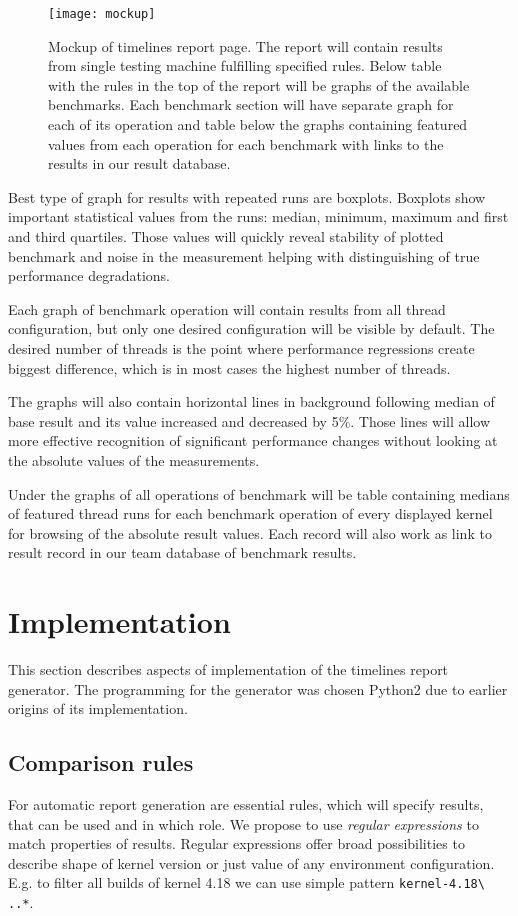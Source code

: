 \begin{figure}
  \centering
  \texttt{[image: mockup]}
  \caption{Mockup of timelines report page. The report will contain results from
    single testing machine fulfilling specified rules. Below table with the rules
    in the top of the report will be graphs of the available benchmarks. Each
    benchmark section will have separate graph for each of its operation and table
    below the graphs containing featured values from each operation for each
    benchmark with links to the results in our result database.}
  \label{fig:mockup}
\end{figure}

Best type of graph for results with repeated runs are boxplots. Boxplots show
important statistical values from the runs: median, minimum, maximum and first
and third quartiles. Those values will quickly reveal stability of plotted
benchmark and noise in the measurement helping with distinguishing of true
performance degradations.

Each graph of benchmark operation will contain results from all thread
configuration, but only one desired configuration will be visible by default.
The desired number of threads is the point where performance regressions create
biggest difference, which is in most cases the highest number of threads.

The graphs will also contain horizontal lines in background following median of
base result and its value increased and decreased by 5\%. Those lines will allow
more effective recognition of significant performance changes without looking at
the absolute values of the measurements.

Under the graphs of all operations of benchmark will be table containing medians
of featured thread runs for each benchmark operation of every displayed kernel
for browsing of the absolute result values. Each record will also work as link
to result record in our team database of benchmark results.

\section{Implementation}
This section describes aspects of implementation of the timelines report generator.
The programming for the generator was chosen Python2 due to earlier origins of
its implementation.

\subsection{Comparison rules}
For automatic report generation are essential rules, which will specify results,
that can be used and in which role. We propose to use \emph{regular expressions} to match
properties of results. Regular expressions offer broad possibilities to describe
shape of kernel version or just value of any environment configuration. E.g. to filter
all builds of kernel 4.18 we can use simple pattern \texttt{kernel-4.18\textbackslash
..*}.

